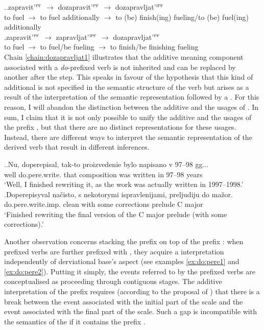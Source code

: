 \ex.\label{chain:dozapravljat}\ag.\label{chain:dozapravljat1}zapravit'$^{\textsc{pf}}$ $\rightarrow$ dozapravit'$^{\textsc{pf}}$ $\rightarrow$ dozapravljat'$^{\textsc{ipf}}$\\
{to fuel} $\rightarrow$ {to fuel additionally} $\rightarrow$ {to (be) finish(ing) fueling/to (be) fuel(ing) additionally}\\
\bg.\label{chain:dozapravljat2}zapravit'$^{\textsc{pf}}$ $\rightarrow$ zapravljat'$^{\textsc{ipf}}$ $\rightarrow$ dozapravljat'$^{\textsc{pf}}$\\
{to fuel} $\rightarrow$ {to fuel/be fueling} $\rightarrow$ {to finish/be finishing fueling}\\

Chain \ref{chain:dozapravljat1} illustrates that the additive meaning component associated with a \textit{do}-prefixed verb is not inherited and can be replaced by another  after the  step. This speaks in favour of the hypothesis that this kind of additional  is not specified in the semantic structure of the verb but arises as a result of the interpretation of the semantic representation followed by a . For this reason, I will abandon the distinction between the additive and the  usages of . In sum, I claim that it is not only possible to unify the additive and the  usages of the prefix , but that there are no distinct representations for these usages. Instead, there are different ways to interpret the semantic representation of the derived verb that result in different inferences. 

\ex.\ag.\label{ex:do:pere1}Nu, doperepisal, tak-to proizvedenie bylo napisano v 97--98 gg...\\
well do.pere.write. that composition was written in 97--98 years\\
\trans `Well, I finished rewriting it, as the work was actually written in 1997--1998.'
\bg.\label{ex:do:pere2}Doperepisyval na\v{c}isto, s nekotorymi ispravlenijami, preljudiju do ma\v{z}or.\\
do.pere.write.imp. clean with some corrections prelude C major\\
\trans `Finished rewriting the final version of the C major prelude (with some corrections).'

Another observation concerns stacking the prefix  on top of the prefix  : when prefixed verbs are further prefixed with , they acquire a  interpretation independently of derviational base's aspect (see examples \ref{ex:do:pere1} and \ref{ex:do:pere2}). Putting it simply, the events referred to by the prefixed verbs are conceptualised as proceeding through contiguous stages. The additive interpretation of the prefix  requires (according to the proposal of \citealt{Kagan:book}) that there is a break between the event associated with the initial part of the scale and the event associated with the final part of the scale. Such a gap is incompatible with the semantics of the  if it contains the prefix . 

